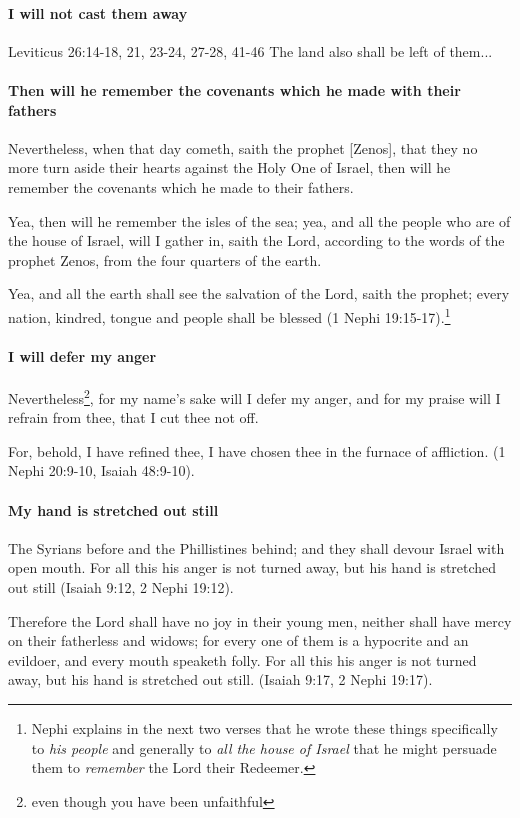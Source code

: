 \paragraph{I will not cast them away}
Leviticus 26:14-18, 21, 23-24, 27-28, 41-46
The land also shall be left of them...

\paragraph{Then will he remember the covenants which he made with their fathers}
Nevertheless, when that day cometh, saith the prophet [Zenos], that they no more turn aside their hearts against the Holy One of Israel, then will he remember the covenants which he made to their fathers.

Yea, then will he remember the isles of the sea; yea, and all the people who are of the house of Israel, will I gather in, saith the Lord, according to the words of the prophet Zenos, from the four quarters of the earth.

Yea, and all the earth shall see the salvation of the Lord, saith the prophet; every nation, kindred, tongue and people shall be blessed (1 Nephi 19:15-17).\footnote{Nephi explains in the next two verses that he wrote these things specifically to \textit{his people} and generally to \textit{all the house of Israel} that he might persuade them to \textit{remember} the Lord their Redeemer.}

\paragraph{I will defer my anger}
Nevertheless\footnote{even though you have been unfaithful}, for my name's sake will I defer my anger, and for my praise will I refrain from thee, that I cut thee not off.

For, behold, I have refined thee, I have chosen thee in the furnace of affliction. (1 Nephi 20:9-10, Isaiah 48:9-10).

\paragraph{My hand is stretched out still}
The Syrians before and the Phillistines behind; and they shall devour Israel with open mouth. For all this his anger is not turned away, but his hand is stretched out still (Isaiah 9:12, 2 Nephi 19:12).

Therefore the Lord shall have no joy in their young men, neither shall have mercy on their fatherless and widows; for every one of them is a hypocrite and an evildoer, and every mouth speaketh folly. For all this his anger is not turned away, but his hand is stretched out still. (Isaiah 9:17, 2 Nephi 19:17).

